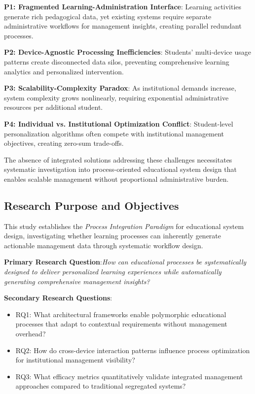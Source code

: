 \documentclass[conference]{IEEEtran}
\begin{document}
\textbf{P1: Fragmented Learning-Administration Interface}: Learning activities generate rich pedagogical data, yet existing systems require separate administrative workflows for management insights, creating parallel redundant processes.

\textbf{P2: Device-Agnostic Processing Inefficiencies}: Students' multi-device usage patterns create disconnected data silos, preventing comprehensive learning analytics and personalized intervention.

\textbf{P3: Scalability-Complexity Paradox}: As institutional demands increase, system complexity grows nonlinearly, requiring exponential administrative resources per additional student.

\textbf{P4: Individual vs. Institutional Optimization Conflict}: Student-level personalization algorithms often compete with institutional management objectives, creating zero-sum trade-offs.

The absence of integrated solutions addressing these challenges necessitates systematic investigation into process-oriented educational system design that enables scalable management without proportional administrative burden.

\subsection{Research Purpose and Objectives}
This study establishes the \textit{Process Integration Paradigm} for educational system design, investigating whether learning processes can inherently generate actionable management data through systematic workflow design.

\textbf{Primary Research Question}:\textit{How can educational processes be systematically designed to deliver personalized learning experiences while automatically generating comprehensive management insights?}

\textbf{Secondary Research Questions}:
\begin{itemize}
    \item RQ1: What architectural frameworks enable polymorphic educational processes that adapt to contextual requirements without management overhead?
    \item RQ2: How do cross-device interaction patterns influence process optimization for institutional management visibility?
    \item RQ3: What efficacy metrics quantitatively validate integrated management approaches compared to traditional segregated systems?
\end{itemize}
\end{document}
